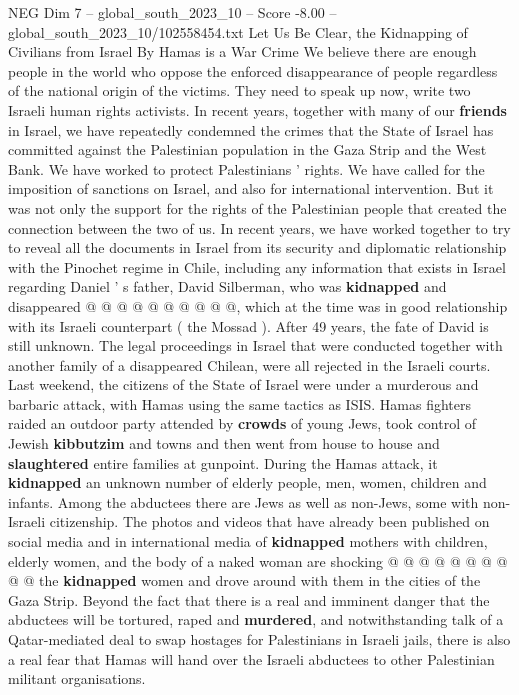 \begin{textsample}{NEG Dim 7 – global\_south\_2023\_10 – Score -8.00 – global\_south\_2023\_10/102558454.txt}  \label{ex:f7_neg_319}
Let Us Be Clear, the Kidnapping of Civilians from Israel By Hamas is a War Crime We believe there are enough people in the world who oppose the enforced disappearance of people regardless of the national origin of the victims.
They need to speak up now, write two Israeli human rights activists.
In recent years, together with many of our \textbf{friends} in Israel, we have repeatedly condemned the crimes that the State of Israel has committed against the Palestinian population in the Gaza Strip and the West Bank.
We have worked to protect Palestinians ' rights.
We have called for the imposition of sanctions on Israel, and also for international intervention.
But it was not only the support for the rights of the Palestinian people that created the connection between the two of us.
In recent years, we have worked together to try to reveal all the documents in Israel from its security and diplomatic relationship with the Pinochet regime in Chile, including any information that exists in Israel regarding Daniel ' s father, David Silberman, who was \textbf{kidnapped} and disappeared @ @ @ @ @ @ @ @ @ @, which at the time was in good relationship with its Israeli counterpart ( the Mossad ).
After 49 years, the fate of David is still unknown.
The legal proceedings in Israel that were conducted together with another family of a disappeared Chilean, were all rejected in the Israeli courts.
Last weekend, the citizens of the State of Israel were under a murderous and barbaric attack, with Hamas using the same tactics as ISIS.
Hamas fighters raided an outdoor party attended by \textbf{crowds} of young Jews, took control of Jewish \textbf{kibbutzim} and towns and then went from house to house and \textbf{slaughtered} entire families at gunpoint.
During the Hamas attack, it \textbf{kidnapped} an unknown number of elderly people, men, women, children and infants.
Among the abductees there are Jews as well as non-Jews, some with non-Israeli citizenship.
The photos and videos that have already been published on social media and in international media of \textbf{kidnapped} mothers with children, elderly women, and the body of a naked woman are shocking @ @ @ @ @ @ @ @ @ @ the \textbf{kidnapped} women and drove around with them in the cities of the Gaza Strip.
Beyond the fact that there is a real and imminent danger that the abductees will be tortured, raped and \textbf{murdered}, and notwithstanding talk of a Qatar-mediated deal to swap hostages for Palestinians in Israeli jails, there is also a real fear that Hamas will hand over the Israeli abductees to other Palestinian militant organisations.

\end{textsample}
